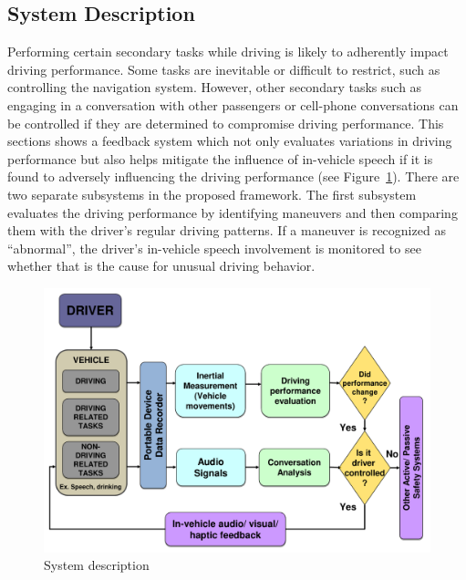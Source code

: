 \subsection{System Description}
\label{sec:system_description}
\vspace{3mm}
Performing certain secondary tasks while driving is likely to adherently impact driving performance. 
Some tasks are inevitable or difficult to restrict, such as controlling the navigation system. 
However, other secondary tasks such as engaging in a conversation with other passengers or cell-phone conversations can be controlled if they are determined to compromise driving performance. 
This sections shows a feedback system which not only evaluates variations in driving performance but also helps mitigate the influence of in-vehicle speech if it is found to adversely influencing the driving performance (see Figure~\ref{fig:system_description_fig}). 
There are two separate subsystems in the proposed framework. 
The first subsystem evaluates the driving performance by identifying maneuvers and then comparing them with the driver's regular driving patterns. 
If a maneuver is recognized as ``abnormal'', the driver's in-vehicle speech involvement is monitored to see whether that is the cause for unusual driving behavior. 

\begin{figure}[h]	
	\centering
	\includegraphics[width=\linewidth]{figures/system_description-crop}
	\caption {System description}
	\label{fig:system_description_fig}
\end{figure}

